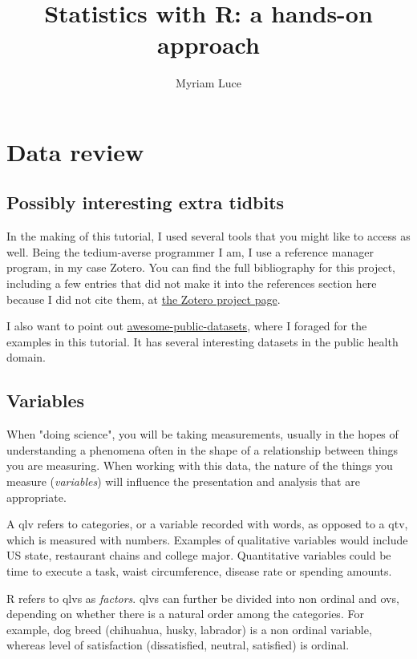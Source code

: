 \documentclass{report}
\author{Myriam Luce}
\title{Statistics with R: a hands-on approach}
\begin{document}
\maketitle
\tableofcontents

\chapter{Data review}
	\section{Possibly interesting extra tidbits}
	In the making of this tutorial, I used several tools that you might like to access as well. Being the tedium-averse programmer I am, I use a reference manager program, in my case Zotero. You can find the full bibliography for this project, including a few entries that did not make it into the references section here because I did not cite them, at \href{https://www.zotero.org/groups/2223910/r_tutorial}{the Zotero project page}.
	
	I also want to point out \href{https://github.com/awesomedata/awesome-public-datasets}{awesome-public-datasets}, where I foraged for the examples in this tutorial. It has several interesting datasets in the public health domain.

	\section{Variables}
	When "doing science", you will be taking measurements, usually in the hopes of understanding a phenomena often in the shape of a relationship between things you are measuring. When working with this data, the nature of the things you measure (\emph{variables}) will influence the presentation and analysis that are appropriate.
	
	A \gls{qlv} refers to categories, or a variable recorded with words, as opposed to a \gls{qtv}, which is measured with numbers. Examples of qualitative variables would include US state, restaurant chains and college major. Quantitative variables could be time to execute a task, waist circumference, disease rate or spending amounts.
	
	R refers to \glspl{qlv} as \emph{factors}. \Glspl{qlv} can further be divided into non ordinal and \glspl{ov}, depending on whether there is a natural order among the categories. For example, dog breed (chihuahua, husky, labrador) is a non ordinal variable, whereas level of satisfaction (dissatisfied, neutral, satisfied) is ordinal.
	
\end{document}
